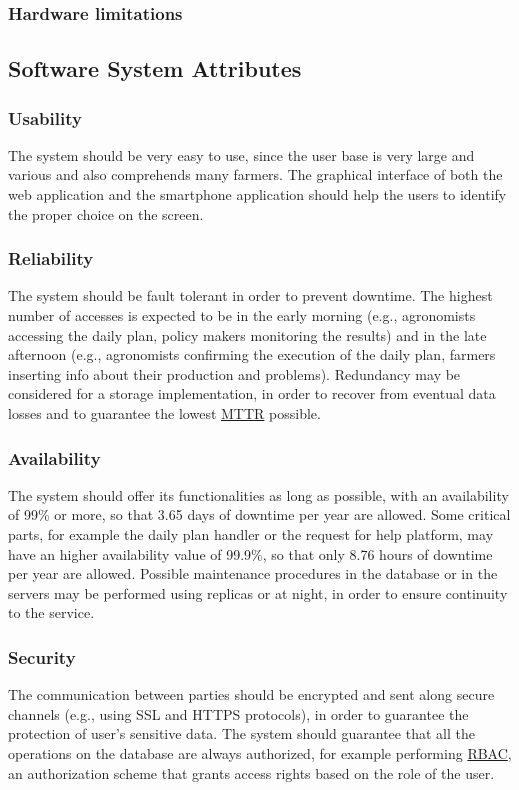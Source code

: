 \subsubsection{Hardware limitations}

\subsection{Software System Attributes}
\subsubsection{Usability}
The system should be very easy to use, since the user base is very large and various and also comprehends many farmers. The graphical interface of both the web application and the smartphone application should help the users to identify the proper choice on the screen.
\subsubsection{Reliability}
The system should be fault tolerant in order to prevent downtime. The highest number of accesses is expected to be in the early morning (e.g., agronomists accessing the daily plan, policy makers monitoring the results) and in the late afternoon (e.g., agronomists confirming the execution of the daily plan, farmers inserting info about their production and problems).
\newline
Redundancy may be considered for a storage implementation, in order to recover from eventual data losses and to guarantee the lowest \hyperref[tab:acronymsTable]{MTTR} possible.
\subsubsection{Availability}
The system should offer its functionalities as long as possible, with an availability of 99\% or more, so that 3.65 days of downtime per year are allowed. Some critical parts, for example the daily plan handler or the request for help platform, may have an higher availability value of 99.9\%, so that only 8.76 hours of downtime per year are allowed. 
\newline
Possible maintenance procedures in the database or in the servers may be performed using replicas or at night, in order to ensure continuity to the service.
\subsubsection{Security}
The communication between parties should be encrypted and sent along secure channels (e.g., using SSL and HTTPS protocols), in order to guarantee the protection of user’s sensitive data. 
\newline
The system should guarantee that all the operations on the database are always authorized, for example performing \hyperref[tab:acronymsTable]{RBAC}, an authorization scheme that grants access rights based on the role of the user.
